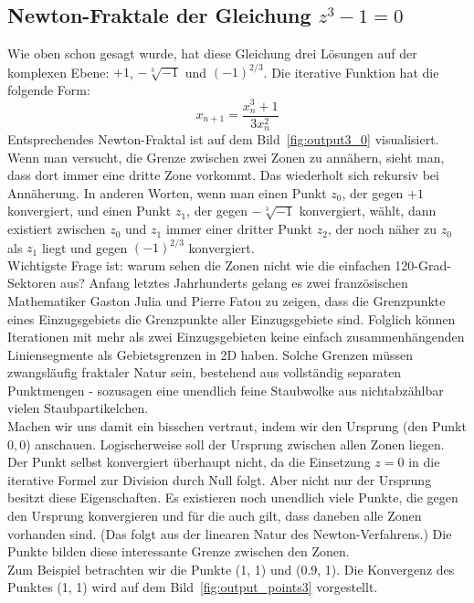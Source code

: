 \documentclass[a4paper,12pt]{llncs}
\numberwithin{equation}{section}
\begin{document}
\subsection{Newton-Fraktale der Gleichung $z^3 - 1 = 0$}
Wie oben schon gesagt wurde, hat diese Gleichung drei Lösungen auf der komplexen Ebene: $+1$, $-\sqrt[3]{-1}$ und $(-1)^{2/3}$.
Die iterative Funktion hat die folgende Form:
\[
x_{n+1} = \frac{x_n^3+1}{3 x_n^2}
\] 
Entsprechendes Newton-Fraktal ist auf dem Bild~\ref{fig:output3_0} visualisiert. 
Wenn man versucht, die Grenze zwischen zwei Zonen zu annähern, sieht man, dass dort immer eine dritte Zone vorkommt. 
Das wiederholt sich rekursiv bei Annäherung.
In anderen Worten, wenn man einen Punkt $z_0$, der gegen $+1$ konvergiert, und einen Punkt $z_1$, der gegen  $-\sqrt[3]{-1}$ konvergiert, wählt, dann existiert zwischen $z_0$ und $z_1$ immer einer dritter Punkt $z_2$, der noch näher zu $z_0$ als $z_1$ liegt und gegen $(-1)^{2/3}$ konvergiert. \\
Wichtigste Frage ist: warum sehen die Zonen nicht wie die einfachen 120-Grad-Sektoren aus?
Anfang letztes Jahrhunderts gelang es zwei französischen Mathematiker Gaston Julia und Pierre Fatou zu zeigen, dass die Grenzpunkte eines Einzugsgebiets die Grenzpunkte aller Einzugsgebiete sind. 
Folglich können Iterationen mit mehr als zwei Einzugsgebieten keine einfach zusammenhängenden Liniensegmente als Gebietsgrenzen in 2D haben. 
Solche Grenzen müssen zwangsläufig fraktaler Natur sein, bestehend aus vollständig separaten Punktmengen - sozusagen eine unendlich feine Staubwolke aus nichtabzählbar vielen Staubpartikelchen.~\cite{frak_cha}\\
Machen wir uns damit ein bisschen vertraut, indem wir den Ursprung (den Punkt $0, 0$) anschauen.
Logischerweise soll der Ursprung zwischen allen Zonen liegen.
Der Punkt selbst konvergiert überhaupt nicht, da die Einsetzung $z=0$ in die iterative Formel zur Division durch Null folgt. 
Aber nicht nur der Ursprung besitzt diese Eigenschaften.
Es existieren noch unendlich viele Punkte, die gegen den Ursprung konvergieren und für die auch gilt, dass daneben alle Zonen vorhanden sind.
(Das folgt aus der linearen Natur des Newton-Verfahrens.)
Die Punkte bilden diese interessante Grenze zwischen den Zonen.\\
Zum Beispiel betrachten wir die Punkte (1, 1) und (0.9, 1). 
Die Konvergenz des Punktes (1, 1) wird auf dem Bild~\ref{fig:output_points3} vorgestellt.\\
\end{document}

